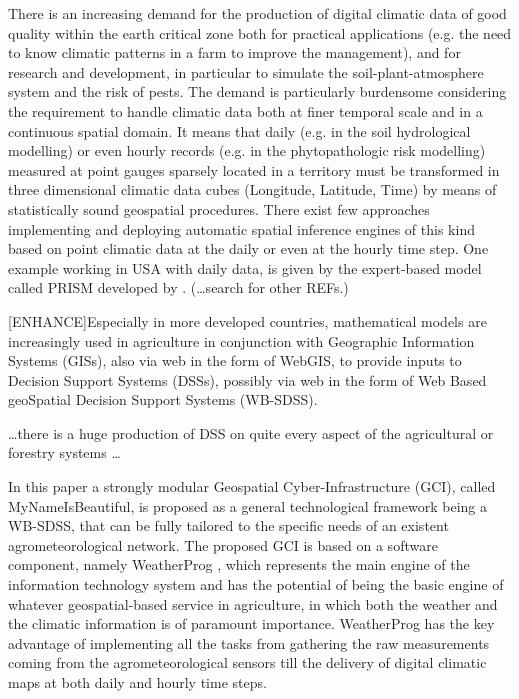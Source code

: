 \documentclass[authoryear,preprint,review,12pt]{elsarticle}
\begin{document}
There is an increasing demand for the production of digital climatic data of good quality within the earth critical zone both 
    for practical applications (e.g. the need to know climatic patterns in a farm to improve the management),
    and
    for research and development, in particular to simulate the soil-plant-atmosphere system and the risk of pests.
The demand is particularly burdensome considering the requirement to handle climatic data both at finer temporal scale and in a continuous spatial domain.
It means that daily (e.g. in the soil hydrological modelling) or even hourly records (e.g. in the phytopathologic risk modelling) measured at point gauges sparsely located in a territory must be transformed in three dimensional climatic data cubes (Longitude, Latitude, Time) by means of statistically sound geospatial procedures.
There exist few approaches implementing and deploying automatic spatial inference engines of this kind based on point climatic data at the daily or even at the hourly time step.
One example working in USA with daily data, is given by the expert-based model called PRISM developed by  \cite{Daly08_PRISM_USA}. (\ldots search for other REFs.)

[ENHANCE]Especially in more developed countries, mathematical models are increasingly used in agriculture in conjunction with Geographic Information Systems (GISs), also via web in the form of WebGIS, to provide inputs to Decision Support Systems (DSSs), possibly via web in the form of Web Based geoSpatial Decision Support Systems (WB-SDSS).

\ldots there is a huge production of DSS on quite every aspect of the agricultural or forestry systems \ldots

In this paper a strongly modular Geospatial Cyber-Infrastructure (GCI), called MyNameIsBeautiful, is proposed as a general technological framework being a WB-SDSS, that can be fully tailored to the specific needs of an existent agrometeorological network.
The proposed GCI is based on a software component, namely WeatherProg \citep{langella:weatherprog2014,langella:weatherprog2016}, which represents the main engine of the information technology system and has the potential of being the basic engine of whatever geospatial-based service in agriculture, in which both the weather and the climatic information is of paramount importance.
WeatherProg has the key advantage of implementing all the tasks from gathering the raw measurements coming from the agrometeorological sensors till the delivery of digital climatic maps at both daily and hourly time steps.
\end{document}
